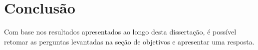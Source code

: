 

\chapter{Conclusão}
\label{conclusao}
	
	Com base nos resultados apresentados ao longo desta dissertação, é possível retomar as perguntas levantadas na seção de objetivos e apresentar uma resposta.
	
